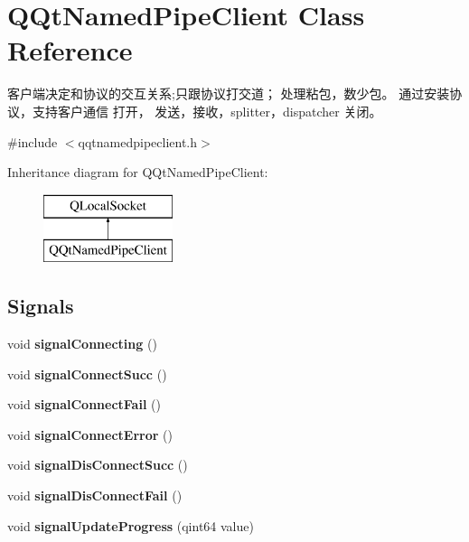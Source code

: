 \hypertarget{class_q_qt_named_pipe_client}{}\section{Q\+Qt\+Named\+Pipe\+Client Class Reference}
\label{class_q_qt_named_pipe_client}


客户端决定和协议的交互关系;只跟协议打交道； 处理粘包，数少包。 通过安装协议，支持客户通信 打开， 发送，接收，splitter，dispatcher 关闭。  




{\ttfamily \#include $<$qqtnamedpipeclient.\+h$>$}

Inheritance diagram for Q\+Qt\+Named\+Pipe\+Client\+:\begin{figure}[H]
\begin{center}
\leavevmode
\includegraphics[height=2.000000cm]{class_q_qt_named_pipe_client}
\end{center}
\end{figure}
\subsection*{Signals}
\begin{DoxyCompactItemize}
\item 
\mbox{\label{class_q_qt_named_pipe_client_a47811c7a78f95b1e4585e66f0730f563}} 
void {\bfseries signal\+Connecting} ()
\item 
\mbox{\label{class_q_qt_named_pipe_client_afc50148c5f39fda58f60ec2d557f6f9d}} 
void {\bfseries signal\+Connect\+Succ} ()
\item 
\mbox{\label{class_q_qt_named_pipe_client_a56b7ca0f8a546887f0ee05c72b8ea61c}} 
void {\bfseries signal\+Connect\+Fail} ()
\item 
\mbox{\label{class_q_qt_named_pipe_client_af86b2ea777ea7fd78214149393898661}} 
void {\bfseries signal\+Connect\+Error} ()
\item 
\mbox{\label{class_q_qt_named_pipe_client_ab8ad25e3ab63ecac005af526f7f0c974}} 
void {\bfseries signal\+Dis\+Connect\+Succ} ()
\item 
\mbox{\label{class_q_qt_named_pipe_client_a5edd02525f965e6c9ec7ebf59281248d}} 
void {\bfseries signal\+Dis\+Connect\+Fail} ()
\item 
\mbox{\label{class_q_qt_named_pipe_client_ad5cab399ee960e5dcdb0f7f68b5fe373}} 
void {\bfseries signal\+Update\+Progress} (qint64 value)
\end{DoxyCompactItemize}
